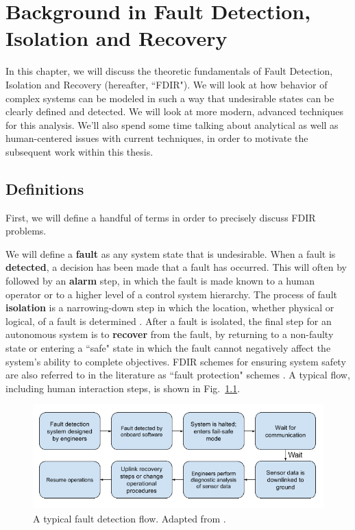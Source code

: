 \chapter{Background in Fault Detection, Isolation and Recovery}

In this chapter, we will discuss the theoretic fundamentals of Fault Detection, Isolation and Recovery (hereafter, ``FDIR"). We will look at how behavior of complex systems can be modeled in such a way that undesirable states can be clearly defined and detected. We will look at more modern, advanced techniques for this analysis. We'll also spend some time talking about analytical as well as human-centered issues with current techniques, in order to motivate the subsequent work within this thesis.

\section{Definitions}

First, we will define a handful of terms in order to precisely discuss FDIR problems.

We will define a \textbf{fault} as any system state that is undesirable. When a fault is \textbf{detected}, a decision has been made that a fault has occurred. This will often by followed by an \textbf{alarm} step, in which the fault is made known to a human operator or to a higher level of a control system hierarchy. The process of fault \textbf{isolation} is a narrowing-down step in which the location, whether physical or logical, of a fault is determined \cite{schwabacher2008pre}. After a fault is isolated, the final step for an autonomous system is to \textbf{recover} from the fault, by returning to a non-faulty state or entering a ``safe" state in which the fault cannot negatively affect the system's ability to complete objectives. FDIR schemes for ensuring system safety are also referred to in the literature as ``fault protection" schemes \cite{kurien2010intrinsic}. A typical flow, including human interaction steps, is shown in Fig.~\ref{fig:fp_flow}.

\begin{figure}[h]
\centering
    \includegraphics[width=\columnwidth]{images/fp_flow2.png}
    \caption{A typical fault detection flow. Adapted from \cite{kurien2010intrinsic}.}
    \label{fig:fp_flow}
\end{figure}

